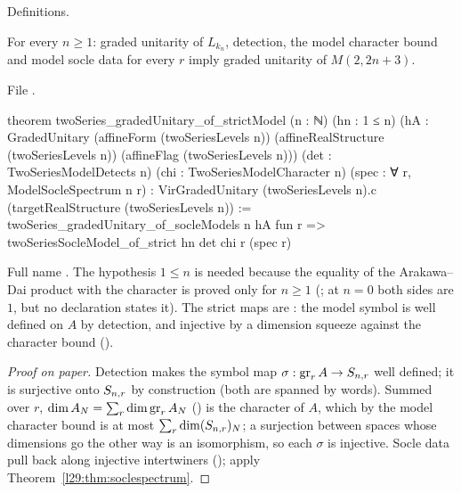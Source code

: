 \begin{status}
Definitions.
\end{status}

\begin{theorem}\label{l29:thm:strict}
For every $n\ge1$: graded unitarity of $L_{k_n}$, detection, the model character bound and model socle data for every
$r$ imply graded unitarity of $M(2,2n+3)$.
\end{theorem}

\noindent File .
\begin{leancode}
theorem twoSeries_gradedUnitary_of_strictModel (n : ℕ) (hn : 1 ≤ n)
    (hA : GradedUnitary (affineForm (twoSeriesLevels n)) (affineRealStructure (twoSeriesLevels n))
      (affineFlag (twoSeriesLevels n)))
    (det : TwoSeriesModelDetects n) (chi : TwoSeriesModelCharacter n)
    (spec : ∀ r, ModelSocleSpectrum n r) :
    VirGradedUnitary (twoSeriesLevels n).c (targetRealStructure (twoSeriesLevels n)) :=
  twoSeries_gradedUnitary_of_socleModels n hA
    fun r => twoSeriesSocleModel_of_strict hn det chi r (spec r)
\end{leancode}

\begin{dictionary}
Full name . The hypothesis $1\le n$ is needed
because the equality of the Arakawa--Dai product with the character is proved only for $n\ge1$ (; at
$n=0$ both sides are $1$, but no declaration states it). The strict
maps are : the model symbol is well defined on $A$ by detection, and injective
by a dimension squeeze against the character bound ().
\end{dictionary}

\begin{proof}[Proof on paper]
Detection makes the symbol map $\sigma:\operatorname{gr}_rA\to S_{n,r}$ well defined; it is surjective onto
$S_{n,r}$ by construction (both are spanned by words). Summed over $r$, $\dim A_N=\sum_r\dim\operatorname{gr}_rA_N$
() is the character of $A$, which by the model character bound is at most
$\sum_r\dim(S_{n,r})_N$; a surjection between spaces whose dimensions go the other way is an isomorphism, so each
$\sigma$ is injective. Socle data pull back along injective intertwiners (); apply
Theorem~\ref{l29:thm:soclespectrum}.
\end{proof}

